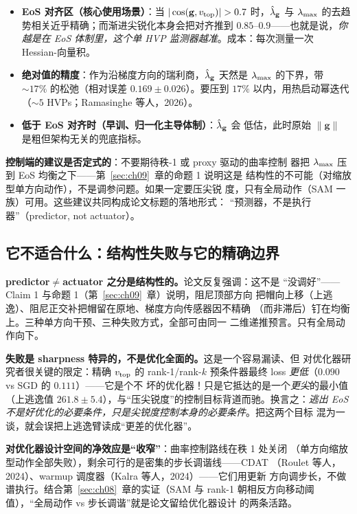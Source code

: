 \begin{itemize}
  \item \textbf{EoS 对齐区（核心使用场景）}：当
        $|\cos(\mathbf{g},\vtope)|>0.7$ 时，$\hat{\lambda}_{\mathbf{g}}$ 与 $\lambda_{\max}$
        的去趋势相关近乎精确；而渐进尖锐化本身会把对齐推到
        $0.85$--$0.9$——也就是说，\emph{你越是在 EoS 体制里，这个单 HVP
        监测器越准}。成本：每次测量一次 Hessian-向量积。
  \item \textbf{绝对值的精度}：作为沿梯度方向的瑞利商，$\hat{\lambda}_{\mathbf{g}}$ 天然是
        $\lambda_{\max}$ 的下界，带 ${\sim}17\%$ 的松弛（相对误差
        $0.169\pm0.026$）。要压到 $17\%$ 以内，用热启动幂迭代
        （${\sim}5$ HVPs；Ramasinghe 等人，2026）。
  \item \textbf{低于 EoS 对齐时（早训、归一化主导体制）}：$\hat{\lambda}_{\mathbf{g}}$ 会
        低估，此时原始 $\|\mathbf{g}\|$ 是粗但架构无关的兜底指标。
\end{itemize}

\textbf{控制端的建议是否定式的}：不要期待秩-1 或 proxy 驱动的曲率控制
器把 $\lambda_{\max}$ 压到 EoS 均衡之下——第~\ref{sec:ch09}~章的命题 1 说明这是
结构性的不可能（对缩放型单方向动作），不是调参问题。如果一定要压尖锐
度，只有全局动作（SAM 一族）可用。这些建议共同构成论文标题的落地形式：
“预测器，不是执行器”（predictor, not actuator）。

\subsection{它不适合什么：结构性失败与它的精确边界}\label{sec:ch10-notfor}

\textbf{predictor$\ne$actuator 之分是结构性的。}论文反复强调：这不是
“没调好”——Claim 1 与命题 1（第~\ref{sec:ch09}~章）说明，阻尼顶部方向
把帽向上移（上逃逸）、阻尼正交补把帽留在原地、梯度方向传感器因不精确
（而非滞后）钉在均衡上。三种单方向干预、三种失败方式，全部可由同一
二维递推预言。只有全局动作向下。

\textbf{失败是 sharpness 特异的，不是优化全面的。}这是一个容易漏读、但
对优化器研究者很关键的限定：精确 $v_{\mathrm{top}}$ 的 rank-1/rank-$k$
预条件器最终 loss \emph{更低}（$0.090$ vs SGD 的 $0.111$）——它是个不
坏的优化器！只是它抵达的是一个\emph{更尖}的最小值（上逃逸值
$261.8\pm5.4$），与“压尖锐度”的控制目标背道而驰。换言之：\emph{逃出
EoS 不是好优化的必要条件，只是尖锐度控制本身的必要条件}。把这两个目标
混为一谈，就会误把上逃逸臂读成“更差的优化器”。

\textbf{对优化器设计空间的净效应是“收窄”}：曲率控制路线在秩 1 处关闭
（单方向缩放型动作全部失败），剩余可行的是密集的步长调谐线——CDAT
（Roulet 等人，2024）、warmup 调度器（Kalra 等人，2024）——它们用更新
方向调步长，不做谱执行。结合第~\ref{sec:ch08}~章的实证（SAM 与 rank-1
朝相反方向移动阈值），“全局动作 vs 步长调谐”就是论文留给优化器设计
的两条活路。


